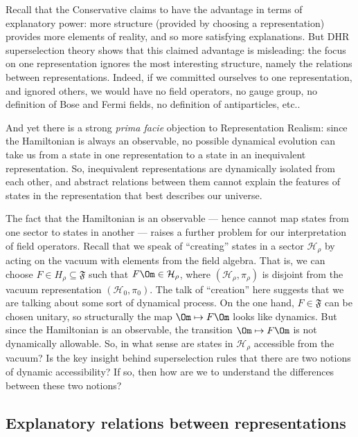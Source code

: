 \documentclass[11pt]{article}
\theoremstyle{definition}
\theoremstyle{definition}
\theoremstyle{remark}
\def\2#1{{\mathcal #1}}
\def\al#1{{\mathfrak #1}}
\begin{document}
Recall that the Conservative claims to have the
advantage in terms of explanatory power: more structure
(provided by choosing a representation) provides more
elements of reality, and so more satisfying
explanations.  But DHR superselection theory shows that
this claimed advantage is misleading: the focus on one
representation ignores the most interesting structure,
namely the relations between representations.  Indeed,
if we committed ourselves to one representation, and
ignored others, we would have no field operators, no
gauge group, no definition of Bose and Fermi fields, no
definition of antiparticles, etc..

And yet there is a strong \emph{prima facie} objection to
Representation Realism: since the Hamiltonian is always an observable,
no possible dynamical evolution can take us from a state in one
representation to a state in an inequivalent representation.  So,
inequivalent representations are dynamically isolated from each other,
and abstract relations between them cannot explain the features of
states in the representation that best describes our universe.

The fact that the Hamiltonian is an observable --- hence cannot map
states from one sector to states in another --- raises a further
problem for our interpretation of field operators.  Recall that we
speak of ``creating'' states in a sector $\2H _\rho$ by acting on the
vacuum with elements from the field algebra.  That is, we can choose
$F\in H_\rho \subseteq \al F$ such that $F\Om \in \2H _\rho$, where
$(\2H _\rho ,\pi _\rho )$ is disjoint from the vacuum representation
$(\2H _0,\pi _0)$.  The talk of ``creation'' here suggests that we are
talking about some sort of dynamical process.  On the one hand, $F\in
\al F$ can be chosen unitary, so structurally the map $\Om \mapsto
F\Om$ looks like dynamics.  But since the Hamiltonian is an
observable, the transition $\Om \mapsto F\Om$ is not dynamically
allowable.  So, in what sense are states in $\2H _\rho$ accessible
from the vacuum?  Is the key insight behind superselection rules that
there are two notions of dynamic accessibility?  If so, then how are
we to understand the differences between these two notions?


\subsection{Explanatory relations between representations}
\end{document}
